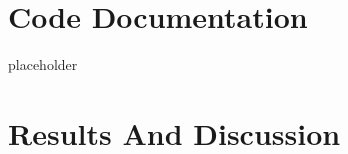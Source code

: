 \documentclass[12pt]{article}
\begin{document}





\section{Code Documentation}

placeholder
\section{Results And Discussion}

%
%
%
%
%
%
%
%
%
%
\end{document}

